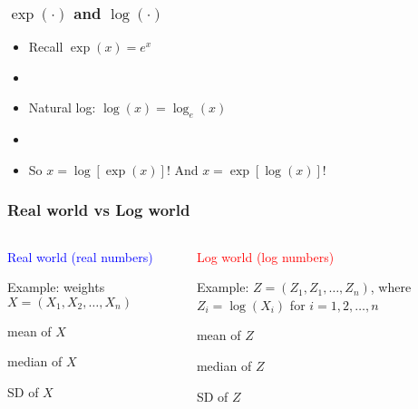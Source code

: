 \documentclass[11pt]{beamer}
\newcommand{\myframe}[1]{\begin{frame} \frametitle{#1}}
\begin{document}
\myframe{$\exp(\cdot)$ and $\log(\cdot)$}
\begin{itemize}
\item Recall $\exp(x) = e^x$
\item[]
\item Natural log: $\log (x) = \log_e(x)$
\item[]
\item So $x = \log [\exp(x)]$! And $x = \exp[\log(x)]$!
\end{itemize}
\end{frame}

\myframe{Real world vs Log world}
\begin{columns}
\begin{column}{0.45\textwidth}
\textcolor{blue}{Real world (real numbers)}

Example: weights $X = (X_1, X_2, \dots, X_n)$

\begin{center}
\end{center}

\centering
mean of $X$

median of $X$

SD of $X$
\end{column}
\begin{column}{0.1\textwidth}
\vspace{-5cm}
\begin{center}
\end{center}
\end{column}
\begin{column}{0.45\textwidth}
\textcolor{red}{Log world (log numbers)}

Example: {\fontsize{9pt}{7.2}\selectfont $Z = (Z_1, Z_1, \dots, Z_n)$, where $Z_i = \log(X_i)$ for} {\tiny $i = 1, 2, \dots, n$}

\begin{center}
\end{center}

\centering
mean of $Z$ 

median of $Z$ 

SD of $Z$
\end{column}
\end{columns}
\end{frame}
\end{document}
